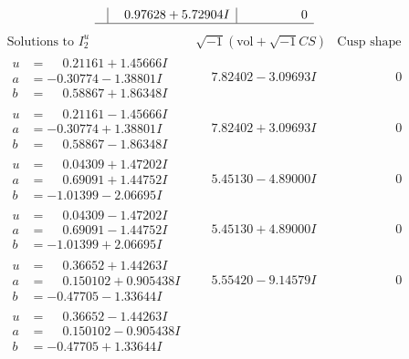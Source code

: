 \documentclass[1p]{elsarticle_modified}
\theoremstyle{definition}
\newcommand{\I}{\sqrt{-1}}
\begin{document}
$$\begin{array}{c|c|c}
 & \phantom{-}0.97628 + 5.72904 I & \phantom{-0.000000 } 0\\
 \hline 
 \end{array}$$\newpage$$\begin{array}{c|c|c}  
\text{Solutions to }I^u_{2}& \I (\text{vol} + \sqrt{-1}CS) & \text{Cusp shape}\\
 \hline 
\begin{aligned}
u &= \phantom{-}0.21161 + 1.45666 I \\
a &= -0.30774 - 1.38801 I \\
b &= \phantom{-}0.58867 + 1.86348 I\end{aligned}
 & \phantom{-}7.82402 - 3.09693 I & \phantom{-0.000000 } 0 \\ \hline\begin{aligned}
u &= \phantom{-}0.21161 - 1.45666 I \\
a &= -0.30774 + 1.38801 I \\
b &= \phantom{-}0.58867 - 1.86348 I\end{aligned}
 & \phantom{-}7.82402 + 3.09693 I & \phantom{-0.000000 } 0 \\ \hline\begin{aligned}
u &= \phantom{-}0.04309 + 1.47202 I \\
a &= \phantom{-}0.69091 + 1.44752 I \\
b &= -1.01399 - 2.06695 I\end{aligned}
 & \phantom{-}5.45130 - 4.89000 I & \phantom{-0.000000 } 0 \\ \hline\begin{aligned}
u &= \phantom{-}0.04309 - 1.47202 I \\
a &= \phantom{-}0.69091 - 1.44752 I \\
b &= -1.01399 + 2.06695 I\end{aligned}
 & \phantom{-}5.45130 + 4.89000 I & \phantom{-0.000000 } 0 \\ \hline\begin{aligned}
u &= \phantom{-}0.36652 + 1.44263 I \\
a &= \phantom{-}0.150102 + 0.905438 I \\
b &= -0.47705 - 1.33644 I\end{aligned}
 & \phantom{-}5.55420 - 9.14579 I & \phantom{-0.000000 } 0 \\ \hline\begin{aligned}
u &= \phantom{-}0.36652 - 1.44263 I \\
a &= \phantom{-}0.150102 - 0.905438 I \\
b &= -0.47705 + 1.33644 I\end{aligned}

\end{array}$$
\end{document}
